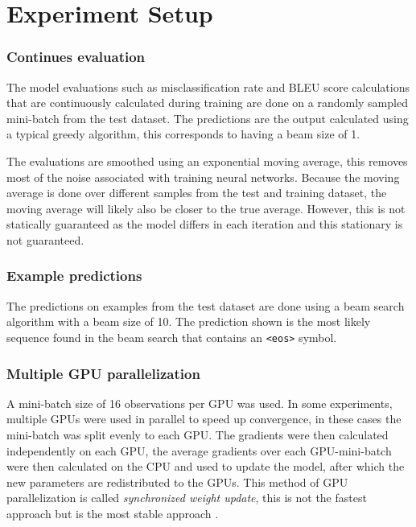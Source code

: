 
\section{Experiment Setup}

\subsubsection{Continues evaluation}
The model evaluations such as misclassification rate and BLEU score calculations that are continuously calculated during training are done on a randomly sampled mini-batch from the test dataset. The predictions are the output calculated using a typical greedy algorithm, this corresponds to having a beam size of 1.

The evaluations are smoothed using an exponential moving average, this removes most of the noise associated with training neural networks. Because the moving average is done over different samples from the test and training dataset, the moving average will likely also be closer to the true average. However, this is not statically guaranteed as the model differs in each iteration and this stationary is not guaranteed.

\subsubsection{Example predictions}
The predictions on examples from the test dataset are done using a beam search algorithm with a beam size of 10. The prediction shown is the most likely sequence found in the beam search that contains an \texttt{<eos>} symbol.

\subsubsection{Multiple GPU parallelization}
A mini-batch size of 16 observations per GPU was used. In some experiments, multiple GPUs were used in parallel to speed up convergence, in these cases the mini-batch was split evenly to each GPU. The gradients were then calculated independently on each GPU, the average gradients over each GPU-mini-batch were then calculated on the CPU and used to update the model, after which the new parameters are redistributed to the GPUs. This method of GPU parallelization is called \textit{synchronized weight update}, this is not the fastest approach but is the most stable approach \cite[https://arxiv.org/pdf/1609.08326.pdf]{citation-needed}.
